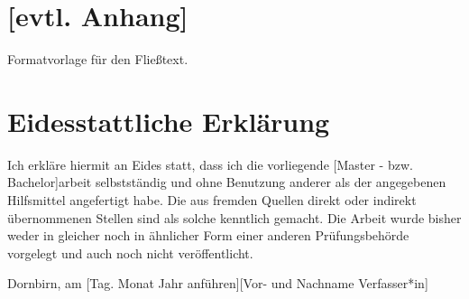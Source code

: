 \documentclass[a4paper,12pt,twoside]{scrreprt}
\begin{document}
\chapter*{[evtl. Anhang]}  %
Formatvorlage für den Fließtext.


\chapter*{Eidesstattliche Erklärung}
Ich erkläre hiermit an Eides statt, dass ich die vorliegende [Master - bzw. Bachelor]arbeit selbstständig und ohne Benutzung anderer als der angegebenen Hilfsmittel angefertigt habe. Die aus fremden Quellen direkt oder indirekt übernommenen Stellen sind als solche kenntlich gemacht. Die Arbeit wurde bisher weder in gleicher noch in ähnlicher Form einer anderen Prüfungsbehörde vorgelegt und auch noch nicht veröffentlicht.

\vspace{3cm}
\noindent
Dornbirn, am [Tag. Monat Jahr anführen]\hfill [Vor- und Nachname Verfasser*in]
\end{document}
